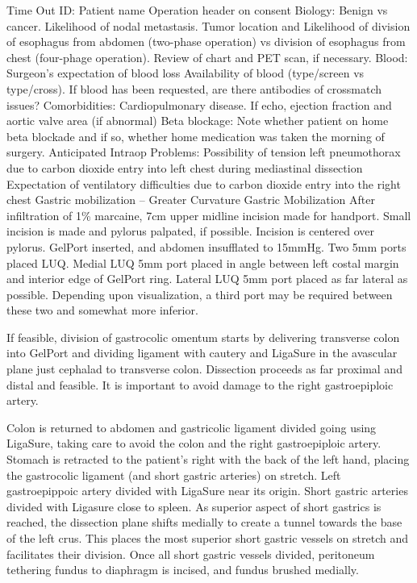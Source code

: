 \documentclass[
]{book}
\begin{document}
Time Out
ID:
Patient name
Operation header on consent
Biology:
Benign vs cancer.
Likelihood of nodal metastasis.
Tumor location and
Likelihood of division of esophagus from abdomen (two-phase operation) vs division of esophagus from chest (four-phage operation).
Review of chart and PET scan, if necessary.
Blood:
Surgeon's expectation of blood loss
Availability of blood (type/screen vs type/cross).
If blood has been requested, are there antibodies of crossmatch issues?
Comorbidities:
Cardiopulmonary disease. If echo, ejection fraction and aortic valve area (if abnormal)
Beta blockage: Note whether patient on home beta blockade and if so, whether home medication was taken the morning of surgery.
Anticipated Intraop Problems:
Possibility of tension left pneumothorax due to carbon dioxide entry into left chest during mediastinal dissection
Expectation of ventilatory difficulties due to carbon dioxide entry into the right chest Gastric mobilization -- Greater Curvature
Gastric Mobilization
After infiltration of 1\% marcaine, 7cm upper midline incision made for handport. Small incision is made and pylorus palpated, if possible. Incision is centered over pylorus. GelPort inserted, and abdomen insufflated to 15mmHg. Two 5mm ports placed LUQ. Medial LUQ 5mm port placed in angle between left costal margin and interior edge of GelPort ring. Lateral LUQ 5mm port placed as far lateral as possible. Depending upon visualization, a third port may be required between these two and somewhat more inferior.

If feasible, division of gastrocolic omentum starts by delivering transverse colon into GelPort and dividing ligament with cautery and LigaSure in the avascular plane just cephalad to transverse colon. Dissection proceeds as far proximal and distal and feasible. It is important to avoid damage to the right gastroepiploic artery.

Colon is returned to abdomen and gastricolic ligament divided going using LigaSure, taking care to avoid the colon and the right gastroepiploic artery. Stomach is retracted to the patient's right with the back of the left hand, placing the gastrocolic ligament (and short gastric arteries) on stretch. Left gastroepippoic artery divided with LigaSure near its origin. Short gastric arteries divided with Ligasure close to spleen. As superior aspect of short gastrics is reached, the dissection plane shifts medially to create a tunnel towards the base of the left crus. This places the most superior short gastric vessels on stretch and facilitates their division. Once all short gastric vessels divided, peritoneum tethering fundus to diaphragm is incised, and fundus brushed medially.
\end{document}
